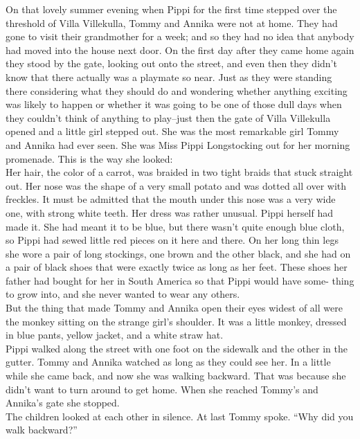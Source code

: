 \documentclass{standard}
\begin{document}
On that lovely summer evening when Pippi for the first time stepped over the threshold of Villa Villekulla, Tommy and Annika were not at home. They had gone to visit their grandmother for a week; and so they had no idea that anybody had moved into the house next door. On the first day after they came home again they stood by the gate, looking out onto the street, and even then they didn’t know that there actually was a playmate so near. Just as they were standing there considering what they should do and wondering whether anything exciting was likely to happen or whether it was going to be one of those dull days when they couldn’t think of anything to play--just then the gate of Villa Villekulla opened and a little girl stepped out. She was the most remarkable girl Tommy and Annika had ever seen. She was Miss Pippi Longstocking out for her morning promenade. This is the way she looked:\\

Her hair, the color of a carrot, was braided in two tight braids that stuck straight out. Her nose was the shape of a very small potato and was dotted all over with freckles. It must be admitted that the mouth under this nose was a very wide one, with strong white teeth. Her dress was rather unusual. Pippi herself had made it. She had meant it to be blue, but there wasn’t quite enough blue cloth, so Pippi had sewed little red pieces on it here and there. On her long thin legs she wore a pair of long stockings, one brown and the other black, and she had on a pair of black shoes that were exactly twice as long as her feet. These shoes her father had bought for her in South America so that Pippi would have some- thing to grow into, and she never wanted to wear any others.\\

But the thing that made Tommy and Annika open their eyes widest of all were the monkey sitting on the strange girl’s shoulder. It was a little monkey, dressed in blue pants, yellow jacket, and a white straw hat.\\

Pippi walked along the street with one foot on the sidewalk and the other in the gutter. Tommy and Annika watched as long as they could see her. In a little while she came back, and now she was walking backward. That was because she didn’t want to turn around to get home. When she reached Tommy’s and Annika’s gate she stopped.\\

The children looked at each other in silence. At last Tommy spoke. ``Why did you walk backward?”\\
\end{document}
